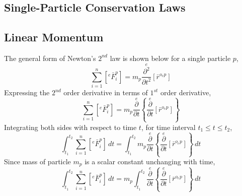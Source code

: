 \documentclass[class=report, 12pt, crop=false]{standalone}
\begin{document}
\begin{center}
\chapter{Single-Particle Conservation Laws}
\begin{comment}
\end{comment}
\section{Linear Momentum}
\begin{comment}
\end{comment}
The general form of Newton's $2^{nd}$ law is shown below for a single particle $p$,
$$\sum^{n}_{i = 1}\left[{}^{e}\bar{F}^{p}_{i}\right] = m_{p}\overset{e}{\frac{\partial^{2}}{\partial t^{2}}}[\bar{r}^{o_{e}p}]$$
Expressing the $2^{nd}$ order derivative in terms of $1^{st}$ order derivative,
$$\sum^{n}_{i = 1}\left[{}^{e}\bar{F}^{p}_{i}\right] = m_{p}\overset{e}{\frac{\partial}{\partial t}}\left\{\overset{e}{\frac{\partial}{\partial t}}[\bar{r}^{o_{e}p}]\right\}$$
Integrating both sides with respect to time $t$, for time interval $t_{1} \leq t \leq t_{2}$,
$$\int^{t_{2}}_{t_{1}} \sum^{n}_{i = 1}\left[{}^{e}\bar{F}^{p}_{i}\right] \,dt = \int^{t_{2}}_{t_{1}} m_{p}\overset{e}{\frac{\partial}{\partial t}}\left\{\overset{e}{\frac{\partial}{\partial t}}[\bar{r}^{o_{e}p}]\right\} \,dt$$
Since mass of particle $m_{p}$ is a scalar constant unchanging with time,
$$\int^{t_{2}}_{t_{1}} \sum^{n}_{i = 1}\left[{}^{e}\bar{F}^{p}_{i}\right] \,dt = m_{p}\int^{t_{2}}_{t_{1}} \overset{e}{\frac{\partial}{\partial t}}\left\{\overset{e}{\frac{\partial}{\partial t}}[\bar{r}^{o_{e}p}]\right\} \,dt$$


\end{center}
\end{document}
